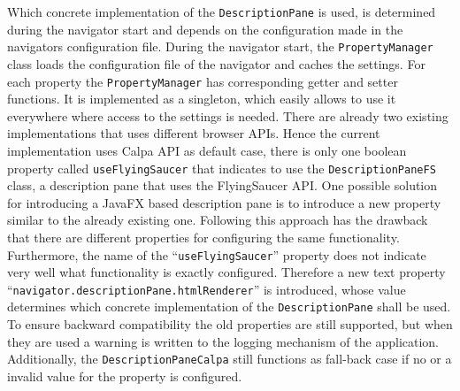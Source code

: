 Which concrete implementation of the \texttt{DescriptionPane} is used, is determined during the navigator start and depends on the configuration made in the navigators configuration file.
During the navigator start, the \texttt{PropertyManager} class loads the configuration file of the navigator and caches the settings.
For each property the \texttt{PropertyManager} has corresponding getter and setter functions.
It is implemented as a singleton, which easily allows to use it everywhere where access to the settings is needed.
There are already two existing implementations that uses different browser APIs.
Hence the current implementation uses Calpa API as default case,  there is only one boolean property called \texttt{useFlyingSaucer} that indicates to use the \texttt{DescriptionPaneFS} class, a description pane that uses the  FlyingSaucer API.
One possible solution for introducing a JavaFX based description pane is to introduce a new property similar to the already existing one.
Following this approach has the drawback that there are different properties for configuring the same functionality.
Furthermore, the name of the \enquote{\texttt{useFlyingSaucer}}  property does not indicate very well what functionality is exactly configured.
Therefore a new text property \enquote{\texttt{navigator.descriptionPane.htmlRenderer}} is introduced, whose value determines which concrete implementation of the \texttt{DescriptionPane} shall be used.
To ensure backward compatibility the old properties are still supported, but when they are used a warning is written to the logging mechanism of the application.
Additionally, the \texttt{DescriptionPaneCalpa} still functions as fall-back case if no or a invalid value for the property is configured.

